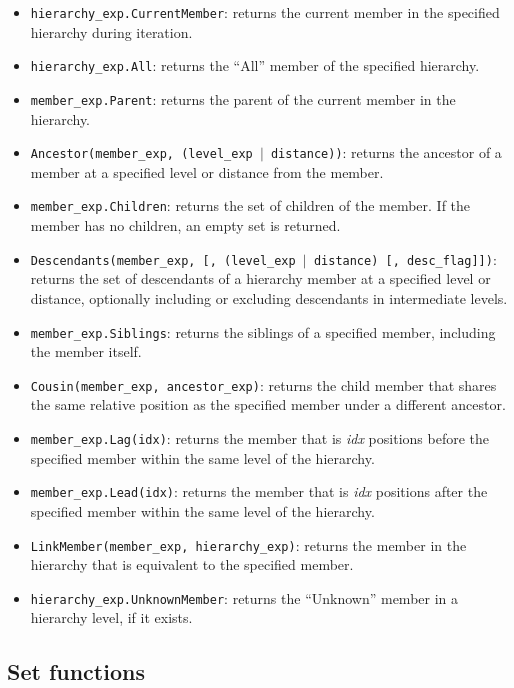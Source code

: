 \begin{itemize}
    \item \texttt{hierarchy\_exp.CurrentMember}: returns the current member in the specified hierarchy during iteration.
    \item \texttt{hierarchy\_exp.All}: returns the ``All'' member of the specified hierarchy.
    \item \texttt{member\_exp.Parent}: returns the parent of the current member in the hierarchy.
    \item \texttt{Ancestor(member\_exp, (level\_exp $|$ distance))}: returns the ancestor of a member at a specified level or distance from the member.
    \item \texttt{member\_exp.Children}: returns the set of children of the member. If the member has no children, an empty set is returned.
    \item \texttt{Descendants(member\_exp, [, (level\_exp $|$ distance) [, desc\_flag]])}: returns the set of descendants of a hierarchy member at a specified level or distance, optionally including or excluding descendants in intermediate levels.
    \item \texttt{member\_exp.Siblings}: returns the siblings of a specified member, including the member itself.
    \item \texttt{Cousin(member\_exp, ancestor\_exp)}: returns the child member that shares the same relative position as the specified member under a different ancestor.
    \item \texttt{member\_exp.Lag(idx)}: returns the member that is \textit{idx} positions before the specified member within the same level of the hierarchy.
    \item \texttt{member\_exp.Lead(idx)}: returns the member that is \textit{idx} positions after the specified member within the same level of the hierarchy.
    \item \texttt{LinkMember(member\_exp, hierarchy\_exp)}: returns the member in the hierarchy that is equivalent to the specified member.
    \item \texttt{hierarchy\_exp.UnknownMember}: returns the ``Unknown'' member in a hierarchy level, if it exists.
\end{itemize}

\subsection{Set functions}

